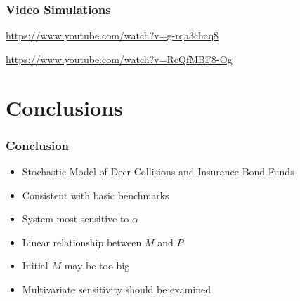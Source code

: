\begin{frame}
    \frametitle{Video Simulations}

	\url{ https://www.youtube.com/watch?v=g-rqa3chaq8}

	\url{https://www.youtube.com/watch?v=RcQfMBF8-Og}

\end{frame}



\section{Conclusions}

\begin{frame}
    \frametitle{Conclusion}
\begin{itemize}
	\item Stochastic Model of Deer-Collisions and Insurance Bond Funds 
	\item Consistent with basic benchmarks
	\item System most sensitive to $\alpha$
	\item Linear relationship between $M$ and $P$
	\item Initial $M$ may be too big
	\item Multivariate sensitivity should be examined
\end{itemize}
\end{frame}



